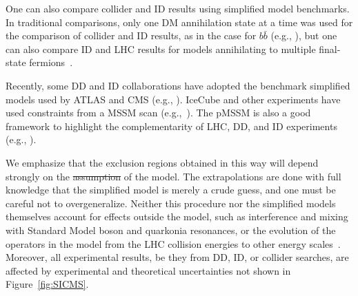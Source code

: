 \documentclass{ar-1col}
\providecommand{\DIFadd}[1]{{\protect\color{blue}\uwave{#1}}} %
\providecommand{\DIFdel}[1]{{\protect\color{red}\sout{#1}}}                      %
\providecommand{\DIFaddbegin}{} %
\providecommand{\DIFaddend}{} %
\providecommand{\DIFdelbegin}{} %
\providecommand{\DIFdelend}{} %
\begin{document}
{One can also compare collider and ID results using
simplified model benchmarks. In traditional comparisons, only one
DM annihilation state at a time was used for the comparison
of collider and ID results, as in the case for $b\bar{b}$ (e.g., ), but one can also compare ID and
LHC results for models annihilating to multiple final-state
fermions~\cite{Carpenter:2016thc}.

Recently, some DD and ID collaborations have adopted the benchmark
simplified models used by ATLAS and CMS (e.g.,
). IceCube and other
experiments have used constraints from a MSSM scan (e.g.,~). The pMSSM is also a good framework
to highlight the complementarity of LHC, DD, and ID experiments (e.g.,
).

\begin{marginnote}[]
\end{marginnote}

We emphasize that the exclusion regions obtained in this
way will depend strongly on the \DIFdelbegin \DIFdel{assumption }\DIFdelend \DIFaddbegin \DIFadd{assumptions }\DIFaddend of the model. The
extrapolations are done with full knowledge that the simplified
model is merely a crude guess, and one must be careful not to
overgeneralize. Neither this procedure nor the
simplified models themselves account for effects outside the
model, such as interference and mixing with Standard Model boson and quarkonia
resonances, or the evolution of the operators in the model from
the LHC collision energies to other energy
scales~\cite{DEramo:2014nmf}. Moreover, all experimental results,
be they from DD, ID, or collider searches, are affected by experimental and
theoretical uncertainties not shown in Figure~\ref{fig:SICMS}.

}
\end{document}
